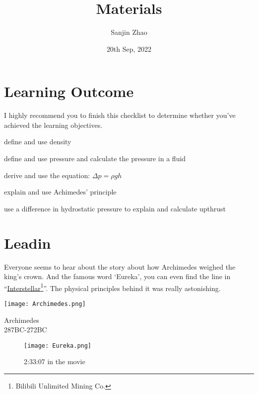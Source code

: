 \documentclass[a4paper]{tufte-handout}
\title{Materials}
\author{Sanjin Zhao}
\date{20th Sep, 2022}  %
\newenvironment{pagefigure}{%
    \begin{figure}[h]
    \classiccaptionstyle
  }{\end{figure}}
\begin{document}
\maketitle%
\section*{Learning Outcome}
I highly recommend you to finish this checklist to determine whether you've achieved the learning objectives.
\begin{todolist}
  \item define and use density
  \item define and use pressure and calculate the pressure in a fluid
  \item derive and use the equation: $\Delta p= \rho g h$
  \item explain and use Achimedes' principle
  \item use a difference in hydrostatic pressure to explain and calculate upthrust
\end{todolist}
\clearpage

\section{Leadin}
Everyone seems to hear about the story about how Archimedes weighed the king's crown. And the famous word `Eureka', you can even find the line in ``\href{https://www.bilibili.com/bangumi/play/ep285026?theme=movie%3Ffrom%3Dsearch&seid=11436052995014682450&spm_id_from=333.337.0.0}{Interstellar}\footnote{Bilibili Unlimited Mining Co.}''. The physical principles behind it was really astonishing.
\begin{marginfigure}
\texttt{[image: Archimedes.png]}
\caption{Archimedes\\287BC-272BC} %
\end{marginfigure}

\begin{pagefigure}
\texttt{[image: Eureka.png]}
\caption{2:33:07 in the movie}
\end{pagefigure}
\end{document}
